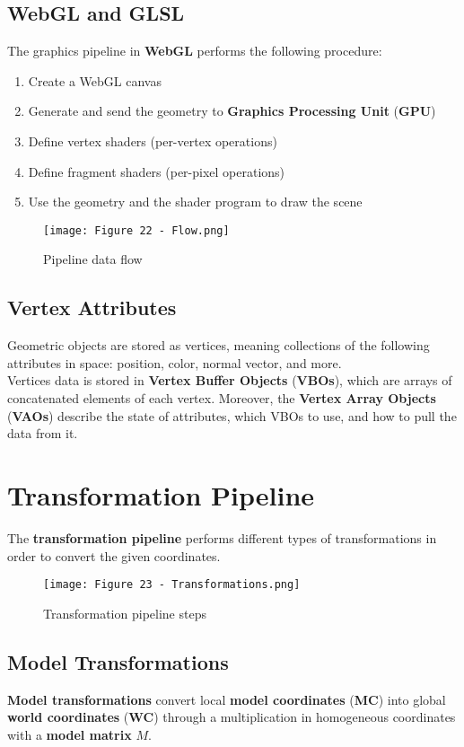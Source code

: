 \documentclass{article}
\begin{document}
\subsection{WebGL and GLSL}
The graphics pipeline in \textbf{WebGL} performs the following procedure:
\begin{enumerate}
    \item Create a WebGL canvas
    \item Generate and send the geometry to \textbf{Graphics Processing Unit} (\textbf{GPU})
    \item Define vertex shaders (per-vertex operations)
    \item Define fragment shaders (per-pixel operations)
    \item Use the geometry and the shader program to draw the scene
\end{enumerate}
\begin{figure}[H]
    \centering
    \texttt{[image: Figure 22 - Flow.png]}
    \caption{Pipeline data flow}
\end{figure}
\subsection{Vertex Attributes}
Geometric objects are stored as vertices, meaning collections of the following attributes in space: position, color, normal vector, and more. \\
Vertices data is stored in \textbf{Vertex Buffer Objects} (\textbf{VBOs}), which are arrays of concatenated elements of each vertex. Moreover, the \textbf{Vertex Array Objects} (\textbf{VAOs}) describe the state of attributes, which VBOs to use, and how to pull the data from it.

\newpage

\section{Transformation Pipeline}
The \textbf{transformation pipeline} performs different types of transformations in order to convert the given coordinates.
\begin{figure}[H]
    \centering
    \texttt{[image: Figure 23 - Transformations.png]}
    \caption{Transformation pipeline steps}
\end{figure}
\subsection{Model Transformations}
\textbf{Model transformations} convert local \textbf{model coordinates} (\textbf{MC}) into global \textbf{world coordinates} (\textbf{WC}) through a multiplication in homogeneous coordinates with a \textbf{model matrix} $M$.
\end{document}
